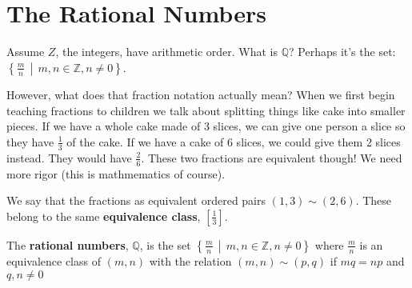 \documentclass[../main.tex]{subfiles}
\begin{document}
\section{The Rational Numbers}

Assume \( Z \), the integers, have arithmetic order.
What is \( \mathbb{Q} \)? Perhaps it's the set: \\
\( \left\{ \displaystyle \frac{m}{n} \, \middle| \, m,n \in \mathbb{Z}, n \neq 0 \right\} \).

However, what does that fraction notation actually mean?
When we first begin teaching fractions to children we talk about splitting things like cake into smaller pieces.
If we have a whole cake made of 3 slices, we can give one person a slice so they have \( \displaystyle \frac{1}{3} \) of the cake.
If we have a cake of 6 slices, we could give them 2 slices instead. They would have \( \displaystyle \frac{2}{6} \).
These two fractions are equivalent though! We need more rigor (this is mathmematics of course).

We say that the fractions as equivalent ordered pairs \( (1, 3) \sim (2,6) \).
These belong to the same \textbf{equivalence class}, \( \left[\displaystyle \frac{1}{3}\right] \).

\begin{definition}
    The \textbf{rational numbers}, \( \mathbb{Q} \), is the set \( \left\{ \displaystyle \frac{m}{n} \, \middle| \, m,n \in \mathbb{Z}, n \neq 0 \right\} \)
    where \( \displaystyle \frac{m}{n} \) is an equivalence class of \( (m,n) \) with the relation \( (m,n) \sim (p,q) \) if \( mq = np \) and \( q,n \neq 0 \)
\end{definition}
\end{document}
